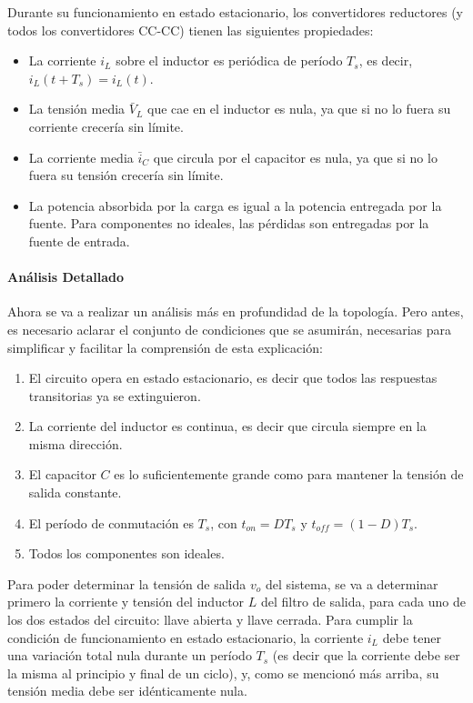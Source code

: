 Durante su funcionamiento en estado estacionario, los convertidores reductores (y todos los convertidores CC-CC) tienen las siguientes propiedades:

\begin{itemize}
    \item La corriente $i_L$ sobre el inductor es periódica de período $T_s$, es decir, $i_L(t+T_s) = i_L(t)$.
    \item La tensión media $\bar{V}_L$ que cae en el inductor es nula, ya que si no lo fuera su corriente crecería sin límite.
    \item La corriente media $\bar{i}_C$ que circula por el capacitor es nula, ya que si no lo fuera su tensión crecería sin límite.
    \item La potencia absorbida por la carga es igual a la potencia entregada por la fuente. Para componentes no ideales, las pérdidas son entregadas por la fuente de entrada.
\end{itemize}

\paragraph{Análisis Detallado}

Ahora se va a realizar un análisis más en profundidad de la topología. Pero antes, es necesario aclarar el conjunto de condiciones que se asumirán, necesarias para simplificar y facilitar la comprensión de esta explicación:

\begin{enumerate}
    \item El circuito opera en estado estacionario, es decir que todos las respuestas transitorias ya se extinguieron.
    \item La corriente del inductor es continua, es decir que circula siempre en la misma dirección.
    \item El capacitor $C$ es lo suficientemente grande como para mantener la tensión de salida constante.
    \item El período de conmutación es $T_s$, con $t_{on} = DT_s$ y $t_{off} = (1-D)T_s$.
    \item Todos los componentes son ideales.
\end{enumerate}

Para poder determinar la tensión de salida $v_o$ del sistema, se va a determinar primero la corriente y tensión del inductor $L$ del filtro de salida, para cada uno de los dos estados del circuito: {\Medium llave abierta} y {\Medium llave cerrada}. Para cumplir la condición de funcionamiento en estado estacionario, la corriente $i_L$ debe tener una variación total nula durante un período $T_s$ (es decir que la corriente debe ser la misma al principio y final de un ciclo), y, como se mencionó más arriba, su tensión media debe ser idénticamente nula.\\

